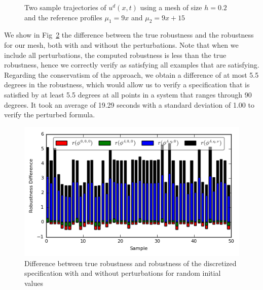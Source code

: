 \documentclass{article}
\begin{document}
\begin{figure}[!t]
    \centering 
        \hfill
        \hfill
        \caption{Two sample trajectories of $u^d(x, t)$ using a mesh of size
        $h=0.2$ and the reference profiles $\mu_1 = 9x$ and $\mu_2 = 9x + 15$}
    \label{fig:ex2_evolution}
\end{figure}


We show in Fig~\ref{fig:res_diffs} the difference between the true robustness and
the robustness for our mesh, both with and without the perturbations. Note that
when we include all perturbations, the computed robustness is less than the true
robustness, hence we correctly verify as satisfying all examples
that are satisfying. Regarding the conservatism of the approach, we obtain a
difference of at most 5.5 degrees in the robustness, which would allow us to verify a
specification that is satisfied by at least 5.5 degrees at all points in a system
that ranges through 90 degrees. It took an average of 19.29 seconds with a
standard deviation of 1.00 to verify the perturbed formula.

\begin{figure}
    \centering
    \includegraphics[width=0.8\linewidth]{figures/cs_ran_init_results.png}
    \caption{Difference between true robustness and robustness of the
        discretized specification with and without perturbations for
        random initial values}
    \label{fig:res_diffs}
\end{figure}
\end{document}
